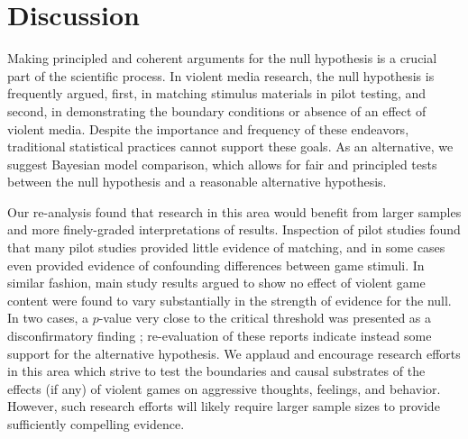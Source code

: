 \documentclass[man]{apa6}
\begin{document}
\section{Discussion} 
Making principled and coherent arguments for the null hypothesis is a crucial part of the scientific process. In violent media research, the null hypothesis is frequently argued, first, in matching stimulus materials in pilot testing, and second, in demonstrating the boundary conditions or absence of an effect of violent media. Despite the importance and frequency of these endeavors, traditional statistical practices cannot support these goals. As an alternative, we suggest Bayesian model comparison, which allows for fair and principled tests between the null hypothesis and a reasonable alternative hypothesis.

Our re-analysis found that research in this area would benefit from larger samples and more finely-graded interpretations of results. Inspection of pilot studies found that many pilot studies provided little evidence of matching, and in some cases even provided evidence of confounding differences between game stimuli. In similar fashion, main study results argued to show no effect of violent game content were found to vary substantially in the strength of evidence for the null. In two cases, a $p$-value very close to the critical threshold was presented as a disconfirmatory finding \citep{Elson:etal:2013;Valadez:Ferguson:2012}; re-evaluation of these reports indicate instead some support for the alternative hypothesis. We applaud and encourage research efforts in this area which strive to test the boundaries and causal substrates of the effects (if any) of violent games on aggressive thoughts, feelings, and behavior. However, such research efforts will likely require larger sample sizes to provide sufficiently compelling evidence. 
\end{document}
